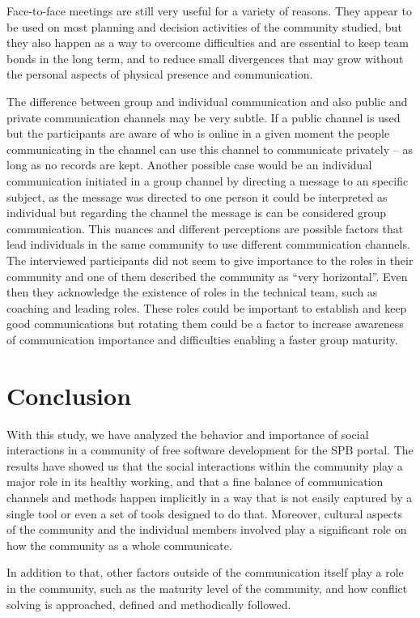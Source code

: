 \documentclass{sigchi}
\begin{document}
Face-to-face meetings are still very useful for a variety of reasons. They appear to be used on most planning and decision activities of the community studied, but they also happen as a way to overcome difficulties and are essential to keep team bonds in the long term, and to reduce small divergences that may grow without the personal aspects of physical presence and communication.

The difference between group and individual communication and also public and private communication channels may be very subtle. If a public channel is used but the participants are aware of who is online in a given moment the people communicating in the channel can use this channel to communicate privately – as long as no records are kept. Another possible case would be an individual communication initiated in a group channel by directing a message to an specific subject, as the message was directed to one person it could be interpreted as individual but regarding the channel the message is can be considered group communication. This nuances and different perceptions are possible factors that lead individuals in the same community to use different communication channels. 
The interviewed participants did not seem to give importance to the roles in their community and one of them described the community as ``very horizontal''. Even then they acknowledge the existence of roles in the technical team, such as coaching and leading roles. These roles could be important to establish and keep good communications but rotating them could be a factor to increase awareness of communication importance and difficulties enabling a faster group maturity.

\section{Conclusion}

With this study, we have analyzed the behavior and importance of social interactions in a community of free software development for the SPB portal. The results have showed us that the social interactions within the community play a major role in its healthy working, and that a fine balance of communication channels and methods happen implicitly in a way that is not easily captured by a single tool or even a set of tools designed to do that. Moreover, cultural aspects of the community and the individual members involved play a significant role on how the community as a whole communicate.

In addition to that, other factors outside of the communication itself play a role in the community, such as the maturity level of the community, and how conflict solving is approached, defined and methodically followed.
\end{document}
